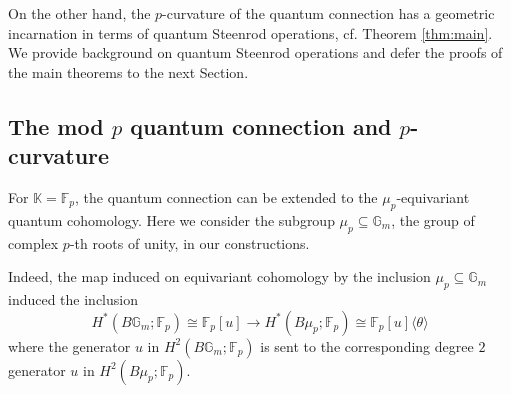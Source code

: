 \documentclass[reqno]{amsart}
\numberwithin{equation}{section}
\numberwithin{equation}{section}
\numberwithin{equation}{section}
\newtheorem{lemma}[thm]{Lemma}
\theoremstyle{definition}
\theoremstyle{remark}
\theoremstyle{remark}
\newtheorem{rem}[thm]{Remark}
\begin{document}
On the other hand, the $p$-curvature of the quantum connection has a geometric incarnation in terms of quantum Steenrod operations, cf. Theorem \ref{thm:main}. We provide background on quantum Steenrod operations and defer the proofs of the main theorems to the next Section.

\subsection{The mod $p$ quantum connection and $p$-curvature}

For $\mathbb{K} = \mathbb{F}_p$, the quantum connection can be extended to the $\mu_p$-equivariant quantum cohomology. Here we consider the subgroup $\mu_p \subseteq \mathbb{G}_m$, the group of complex $p$-th roots of unity, in our constructions.


Indeed, the map induced on equivariant cohomology by the inclusion $\mu_p \subseteq \mathbb{G}_m$ induced the inclusion
\begin{equation}
    H^*(B \mathbb{G}_m; \mathbb{F}_p) \cong \mathbb{F}_p [u] \to H^*(B\mu_p;\mathbb{F}_p) \cong \mathbb{F}_p[u]\langle \theta \rangle
\end{equation}
where the generator $u$ in $H^2(B\mathbb{G}_m;\mathbb{F}_p)$ is sent to the corresponding degree $2$ generator $u$ in $H^2(B\mu_p;\mathbb{F}_p)$.
\end{document}
